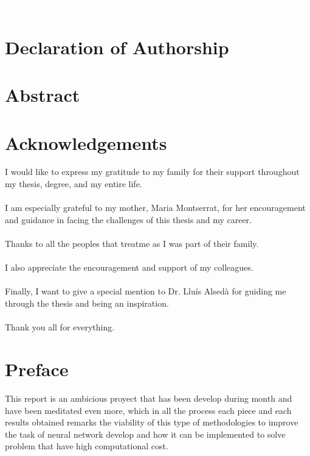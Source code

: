 \documentclass[a4paper, 11pt]{article}
\begin{document}
\justifying
\newpage
\textcolor{white}{a}
\newpage 

\section*{Declaration of Authorship}
\newpage
\section*{Abstract}
\newpage
\section*{Acknowledgements}
I would like to express my gratitude to my family for their support throughout my thesis, degree, and my entire life.\\
\textcolor{white}{a}\\
I am especially grateful to my mother, Maria Montserrat, for her encouragement and guidance in facing the challenges of this thesis and my career.\\
\textcolor{white}{a}\\
Thanks to all the peoples that treatme as I was part of their family.\\
\textcolor{white}{a}\\
I also appreciate the encouragement and support of my colleagues.\\
\textcolor{white}{a}\\
Finally, I want to give a special mention to Dr. Lluís Alsedà for guiding me through the thesis and being an inspiration.\\
\textcolor{white}{a}\\
Thank you all for everything. 
\newpage

\tableofcontents
\listoffigures
\listoftables

\section*{Preface}
This report is an ambicious proyect that has been develop during month and have been meditated even more, which in all the process each piece and each results obtained remarks the viability of this type of methodologies to improve the task of neural network develop and how it can be implemented to solve problem that have high computational cost.



\newpage \pagestyle{extended_plain}
\setcounter{page}{2}
\end{document}
